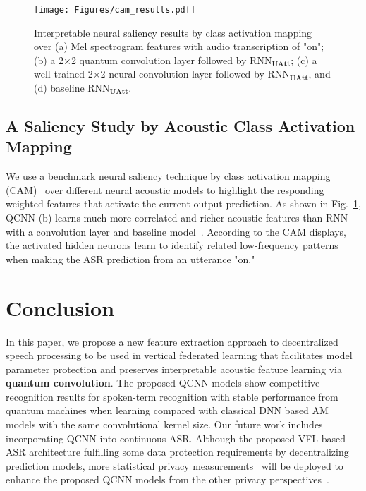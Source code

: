\documentclass{article}
\begin{document}
\begin{figure}[ht!]
\begin{center}
\vspace{-2mm}
  \centering    

\texttt{[image: Figures/cam\_results.pdf]}
\end{center}
\vspace{-0.2cm}
  \caption{Interpretable neural saliency results by class activation mapping~\cite{zhou2016learning} over (a) Mel spectrogram features with audio transcription of "on"; (b) a 2$\times$2 quantum convolution layer followed by RNN$_\mathbf{UAtt}$; (c) a well-trained 2$\times$2 neural convolution layer followed by RNN$_\mathbf{UAtt}$, and (d) baseline RNN$_\mathbf{UAtt}$.
  } 
\label{fig:cam}
\end{figure}
\vspace{-0.2cm}


\subsection{A Saliency Study by Acoustic Class Activation Mapping}
We use a benchmark neural saliency technique by class activation mapping (CAM)~\cite{zhou2016learning} over different neural acoustic models to highlight the responding weighted features that activate the current output prediction. As shown in Fig.~\ref{fig:cam}, QCNN (b) learns much more correlated and richer acoustic features than RNN with a convolution layer and baseline model~\cite{de2018neural}. According to the CAM displays, the activated hidden neurons learn to identify related low-frequency patterns when making the ASR prediction from an utterance "on."

\section{Conclusion}
\label{sec:conclusion}
In this paper, we propose a new feature extraction approach to decentralized speech processing to be used in vertical federated learning that facilitates model parameter protection and preserves interpretable acoustic feature learning via \textbf{quantum convolution}. The proposed QCNN models show competitive recognition results for spoken-term recognition with stable performance from quantum machines when learning compared with classical DNN based AM models with the same convolutional kernel size. Our future work includes incorporating QCNN into continuous ASR. Although the proposed VFL based ASR architecture fulfilling some data protection requirements by decentralizing prediction models, more statistical privacy measurements~\cite{dwork2015reusable} will be deployed to enhance the proposed QCNN models from the other privacy perspectives~\cite{dwork2015reusable, leroy2019federated}. 


\clearpage



\end{document}

